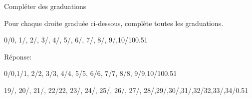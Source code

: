 \documentclass[a4paper,11pt]{report}
\begin{document}
\begin{resolu}{Compléter des graduations}
{Pour chaque droite graduée ci-dessous, complète toutes les graduations.
\begin{tasks}
\task 

\begin{center}
	\begin{numberlined}{0}{10}{10}{1}{0/0, 1/, 2/, 3/, 4/, 5/, 6/, 7/, 8/, 9/,10/10}{0.5}{1}{}
\end{numberlined}
\end{center}
Réponse:
\begin{center}
	\begin{numberlined}{0}{10}{10}{1}{0/0,1/1, 2/2, 3/3, 4/4, 5/5, 6/6, 7/7, 8/8, 9/9,10/10}{0.5}{1}{}
\end{numberlined}
\end{center}

\task
\begin{center}
	\begin{numberlined}{19}{34}{1}{1}{19/, 20/, 21/, 22/22, 23/, 24/, 25/, 26/, 27/, 28/,29/,30/,31/,32/32,33/,34/}{0.5}{1}{}
\end{numberlined}
\end{center}


\end{tasks}}
\end{resolu}
\end{document}
